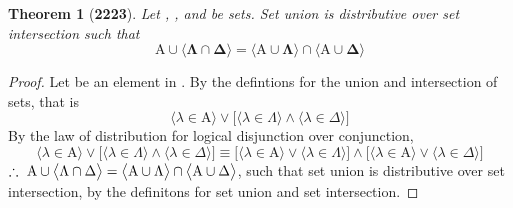 \documentclass[preview]{standalone}
\newtheorem*{theorem*}{Theorem}
\begin{document}
\begin{theorem*}[\textbf{2223}] \color{black}
    Let , \bm{$\Lambda$}, and \bm{$\Delta$} be sets.
    Set union is distributive over set intersection such that
    \begin{equation*}
        \bm{
            \mathrm{A} \cup \Big \langle \Lambda \cap \Delta \Big \rangle 
                =
            \Big \langle \mathrm{A} \cup \Lambda \Big \rangle
                \cap 
            \Big \langle \mathrm{A} \cup \Delta \Big \rangle
        }
    \end{equation*}
\end{theorem*}
\begin{proof} \color{black}
    Let \bm{$\lambda$} be an element in 
    .
    By the defintions for the union and intersection of sets, that is 
    \begin{equation*}
        \big \langle \lambda \in \mathrm{A} \big \rangle
            \lor
        \Big[
            \big \langle \lambda \in \Lambda \big \rangle
                \land
            \big \langle \lambda \in \Delta \big \rangle
        \Big]
    \end{equation*}
    By the law of distribution for logical disjunction over conjunction,
    \begin{equation*}
        \big \langle \lambda \in \mathrm{A} \big \rangle
            \lor
        \Big[
            \big \langle \lambda \in \Lambda \big \rangle
                \land
            \big \langle \lambda \in \Delta \big \rangle
        \Big] 
            \equiv
        \Big[
            \big \langle \lambda \in \mathrm{A} \big \rangle
                \lor
            \big \langle \lambda \in \Lambda \big \rangle
        \Big]
            \land
        \Big[
            \big \langle \lambda \in \mathrm{A} \big \rangle
                \lor
            \big \langle \lambda \in \Delta \big \rangle
        \Big]
    \end{equation*}
    $\therefore \text{\space} \relax{
    \mathrm{A} \cup \big \langle \Lambda \cap \Delta \big \rangle 
        = 
    \big \langle \mathrm{A} \cup \Lambda \big \rangle
        \cap 
    \big \langle \mathrm{A} \cup \Delta \big \rangle
    }$, 
    such that set union is distributive over set intersection,
    by the definitons for set union and set intersection.
\color{lightgray} \end{proof}
\end{document}
